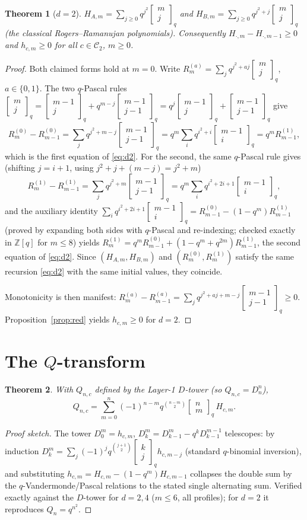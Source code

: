 \documentclass[11pt]{article}
\newtheorem{theorem}{Theorem}
\newcommand{\qbin}[2]{\begin{bmatrix}#1\\#2\end{bmatrix}_q}
\begin{document}
\begin{theorem}[$d=2$]\label{thm:d2}
$H_{A,m}=\sum_{j\ge0}q^{j^2}\qbin{m}{j}$ and $H_{B,m}=\sum_{j\ge0}q^{j^2+j}\qbin{m}{j}$
(the classical Rogers--Ramanujan polynomials). Consequently
$H_{\cdot,m}-H_{\cdot,m-1}\ge0$ and $h_{c,m}\ge0$ for all $c\in\mathcal{C}_2$, $m\ge0$.
\end{theorem}

\begin{proof}
Both claimed forms hold at $m=0$. Write $R^{(a)}_m=\sum_j q^{j^2+aj}\qbin{m}{j}$, $a\in\{0,1\}$.
The two $q$-Pascal rules
$\qbin{m}{j}=\qbin{m-1}{j}+q^{m-j}\qbin{m-1}{j-1}=q^{j}\qbin{m-1}{j}+\qbin{m-1}{j-1}$ give
\[
R^{(0)}_m-R^{(0)}_{m-1}=\sum_j q^{j^2+m-j}\qbin{m-1}{j-1}
=q^m\sum_i q^{i^2+i}\qbin{m-1}{i}=q^mR^{(1)}_{m-1},
\]
which is the first equation of \eqref{eq:d2}. For the second, the same $q$-Pascal rule gives
(shifting $j=i+1$, using $j^2+j+(m-j)=j^2+m$)
\[
R^{(1)}_m-R^{(1)}_{m-1}=\sum_j q^{j^2+m}\qbin{m-1}{j-1}
=q^{m}\sum_i q^{i^2+2i+1}\qbin{m-1}{i},
\]
and the auxiliary identity
$\sum_i q^{i^2+2i+1}\qbin{m-1}{i}=R^{(0)}_{m-1}-(1-q^m)R^{(1)}_{m-1}$
(proved by expanding both sides with $q$-Pascal and re-indexing; checked exactly in
$\mathbb{Z}[q]$ for $m\le8$) yields
$R^{(1)}_m=q^mR^{(0)}_{m-1}+(1-q^m+q^{2m})R^{(1)}_{m-1}$, the second equation of \eqref{eq:d2}.
Since $(H_{A,m},H_{B,m})$ and $(R^{(0)}_m,R^{(1)}_m)$ satisfy the same recursion
\eqref{eq:d2} with the same initial values, they coincide.

Monotonicity is then manifest:
$R^{(a)}_m-R^{(a)}_{m-1}=\sum_j q^{j^2+aj+m-j}\qbin{m-1}{j-1}\ge0$.
Proposition~\ref{prop:red} yields $h_{c,m}\ge0$ for $d=2$.
\end{proof}

\section{The $Q$-transform}

\begin{theorem}\label{thm:Q}
With $Q_{n,c}$ defined by the Layer-1 $D$-tower (so $Q_{n,c}=D^n_n$),
\[
Q_{n,c}=\sum_{m=0}^{n}(-1)^{n-m}q^{\binom{n-m}{2}}\qbin{n}{m}\,H_{c,m}.
\]
\end{theorem}

\begin{proof}[Proof sketch]
The tower $D^m_0=h_{c,m}$, $D^m_k=D^m_{k-1}-q^kD^{m-1}_{k-1}$ telescopes: by induction
$D^m_k=\sum_{j}(-1)^jq^{\binom{j+1}{2}}\qbin{k}{j}h_{c,m-j}$ (standard $q$-binomial
inversion), and substituting $h_{c,m}=H_{c,m}-(1-q^m)H_{c,m-1}$ collapses the double sum
by the $q$-Vandermonde/Pascal relations to the stated single alternating sum.
Verified exactly against the $D$-tower for $d=2,4$ ($m\le6$, all profiles); for $d=2$ it
reproduces $Q_{n}=q^{n^2}$.
\end{proof}
\end{document}
